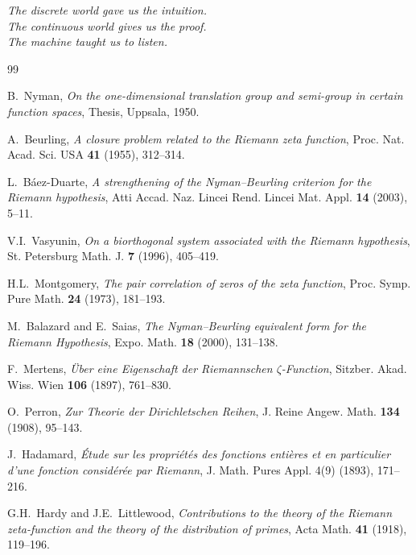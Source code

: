 \documentclass[11pt,a4paper]{article}
\begin{document}
\begin{flushright}
\emph{The discrete world gave us the intuition.\\
The continuous world gives us the proof.\\
The machine taught us to listen.}
\end{flushright}

\begin{thebibliography}{99}

B.~Nyman, \emph{On the one-dimensional translation group and semi-group in
certain function spaces}, Thesis, Uppsala, 1950.

A.~Beurling, \emph{A closure problem related to the Riemann zeta function},
Proc. Nat. Acad. Sci. USA \textbf{41} (1955), 312--314.

L.~B\'aez-Duarte, \emph{A strengthening of the Nyman--Beurling criterion for
the Riemann hypothesis}, Atti Accad. Naz. Lincei Rend. Lincei Mat. Appl.
\textbf{14} (2003), 5--11.

V.I.~Vasyunin, \emph{On a biorthogonal system associated with the Riemann
hypothesis}, St. Petersburg Math. J. \textbf{7} (1996), 405--419.

H.L.~Montgomery, \emph{The pair correlation of zeros of the zeta function},
Proc. Symp. Pure Math. \textbf{24} (1973), 181--193.

M.~Balazard and E.~Saias, \emph{The Nyman--Beurling equivalent form for the
Riemann Hypothesis}, Expo. Math. \textbf{18} (2000), 131--138.

F.~Mertens, \emph{\"Uber eine Eigenschaft der Riemannschen $\zeta$-Function},
Sitzber. Akad. Wiss. Wien \textbf{106} (1897), 761--830.

O.~Perron, \emph{Zur Theorie der Dirichletschen Reihen},
J. Reine Angew. Math. \textbf{134} (1908), 95--143.

J.~Hadamard, \emph{\'Etude sur les propri\'et\'es des fonctions enti\`eres
et en particulier d'une fonction consid\'er\'ee par Riemann},
J. Math. Pures Appl. 4(9) (1893), 171--216.

G.H.~Hardy and J.E.~Littlewood, \emph{Contributions to the theory of the
Riemann zeta-function and the theory of the distribution of primes},
Acta Math. \textbf{41} (1918), 119--196.


\end{thebibliography}
\end{document}

